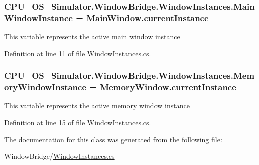 \subsubsection[{Main\+Window\+Instance}]{ C\+P\+U\+\_\+\+O\+S\+\_\+\+Simulator.\+Window\+Bridge.\+Window\+Instances.\+Main\+Window\+Instance = {\bf Main\+Window.\+current\+Instance}\hspace{0.3cm}{\ttfamily [static]}}\label{class_c_p_u___o_s___simulator_1_1_window_bridge_1_1_window_instances_a130a2c32e8ccfd51a42ecb363fbb42cc}


This variable represents the active main window instance 



Definition at line 11 of file Window\+Instances.\+cs.

\hypertarget{class_c_p_u___o_s___simulator_1_1_window_bridge_1_1_window_instances_a401fd485bde830472a1a960a25ec1464}{}
\subsubsection[{Memory\+Window\+Instance}]{ C\+P\+U\+\_\+\+O\+S\+\_\+\+Simulator.\+Window\+Bridge.\+Window\+Instances.\+Memory\+Window\+Instance = {\bf Memory\+Window.\+current\+Instance}\hspace{0.3cm}{\ttfamily [static]}}\label{class_c_p_u___o_s___simulator_1_1_window_bridge_1_1_window_instances_a401fd485bde830472a1a960a25ec1464}


This variable represents the active memory window instance 



Definition at line 15 of file Window\+Instances.\+cs.



The documentation for this class was generated from the following file\+:\begin{DoxyCompactItemize}
\item 
Window\+Bridge/\hyperlink{_window_instances_8cs}{Window\+Instances.\+cs}\end{DoxyCompactItemize}
